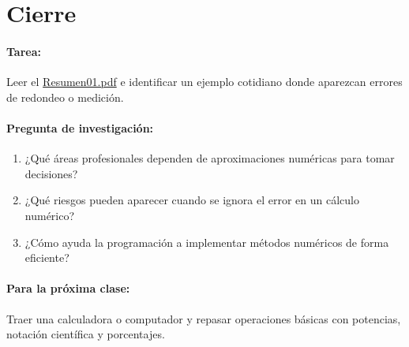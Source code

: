 \documentclass[a4,11pt]{aleph-notas}
\begin{document}
\section*{Cierre}

\paragraph{Tarea:}
Leer el \href{https://fcena-puce.github.io/FCENA-PUCE/MetodosNumericos-05-N0062/2-Resumenes/Resumen01.pdf}{Resumen01.pdf} e identificar un ejemplo cotidiano donde aparezcan errores de redondeo o medición.

\paragraph{Pregunta de investigación:}  
\begin{enumerate}[leftmargin=*]
    \item ¿Qué áreas profesionales dependen de aproximaciones numéricas para tomar decisiones?
    \item ¿Qué riesgos pueden aparecer cuando se ignora el error en un cálculo numérico?
    \item ¿Cómo ayuda la programación a implementar métodos numéricos de forma eficiente?
\end{enumerate}
    
\paragraph{Para la próxima clase:}  
Traer una calculadora o computador y repasar operaciones básicas con potencias, notación científica y porcentajes.
\end{document}
